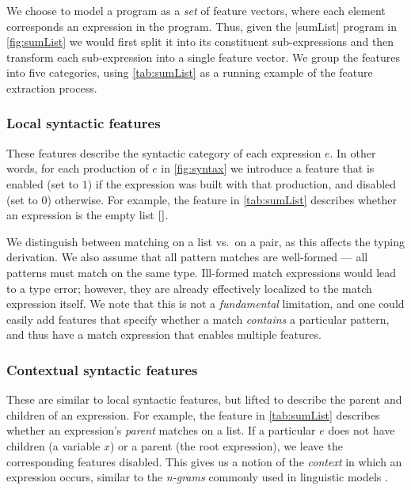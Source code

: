 We choose to model a program as a \emph{set} of feature vectors, where
each element corresponds an expression in the program.
%
Thus, given the |sumList| program in \autoref{fig:sumList} we
would first split it into its constituent sub-expressions and then
transform each sub-expression into a single feature vector.
%
We group the features into five categories, using \autoref{tab:sumList}
as a running example of the feature extraction process.

\subsubsection{Local syntactic features}
These features describe the syntactic category of each expression $e$.
%
In other words, for each production of $e$ in \autoref{fig:syntax} we
introduce a feature that is enabled (set to $1$) if the expression was
built with that production, and disabled (set to $0$) otherwise.
%
For example, the \IsNil feature in \autoref{tab:sumList} describes
whether an expression is the empty list $\mathtt{[]}$.

We distinguish between matching on a list vs.\ on a pair, as this
affects the typing derivation.
%
We also assume that all pattern matches are well-formed --- \ie all
patterns must match on the same type.
%
Ill-formed match expressions would lead to a type error; however, they
are already effectively localized to the match expression itself.
%
We note that this is not a \emph{fundamental} limitation, and one could
easily add features that specify whether a match \emph{contains} a
particular pattern, and thus have a match expression that enables multiple
features.

\subsubsection{Contextual syntactic features}
These are similar to local syntactic features, but lifted to describe the
parent and children of an expression.
%
For example, the \IsCaseListP feature in \autoref{tab:sumList} describes
whether an expression's \emph{parent} matches on a list.
%
If a particular $e$ does not have children (\eg a variable $x$) or a
parent (\ie the root expression), we leave the corresponding features
disabled.
%
This gives us a notion of the \emph{context} in which an expression
occurs, similar to the \emph{n-grams} commonly used in linguistic
models \citep{Hindle2012-hf,Gabel2010-el}.


